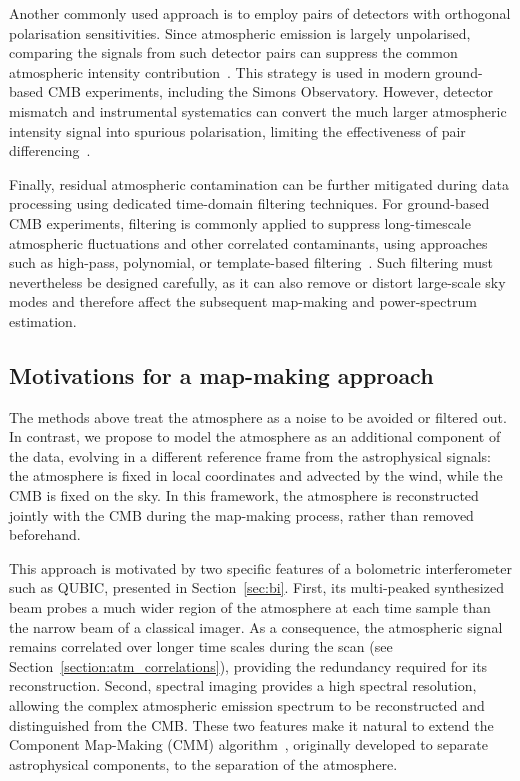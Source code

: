 \documentclass[a4paper,11pt]{article}
\begin{document}
Another commonly used approach is to employ pairs of detectors with orthogonal polarisation sensitivities. Since atmospheric emission is largely unpolarised, comparing the signals from such detector pairs can suppress the common atmospheric intensity contribution~\cite{errard2015,Biquard_2025}. This strategy is used in modern ground-based CMB experiments, including the Simons Observatory. However, detector mismatch and instrumental systematics can convert the much larger atmospheric intensity signal into spurious polarisation, limiting the effectiveness of pair differencing~\cite{Biquard_2025}.

Finally, residual atmospheric contamination can be further mitigated during data processing using dedicated time-domain filtering techniques. For ground-based CMB experiments, filtering is commonly applied to suppress long-timescale atmospheric fluctuations and other correlated contaminants, using approaches such as high-pass, polynomial, or template-based filtering~\cite{Poletti_2017,Wu_2023}. Such filtering must nevertheless be designed carefully, as it can also remove or distort large-scale sky modes and therefore affect the subsequent map-making and power-spectrum estimation.

\subsection{Motivations for a map-making approach}
\label{sec:motivations}

The methods above treat the atmosphere as a noise to be avoided or filtered out. In contrast, we propose to model the atmosphere as an additional component of the data, evolving in a different reference frame from the astrophysical signals: the atmosphere is fixed in local coordinates and advected by the wind, while the CMB is fixed on the sky. In this framework, the atmosphere is reconstructed jointly with the CMB during the map-making process, rather than removed beforehand.

This approach is motivated by two specific features of a bolometric interferometer such as QUBIC, presented in Section~\ref{sec:bi}. First, its multi-peaked synthesized beam probes a much wider region of the atmosphere at each time sample than the narrow beam of a classical imager. As a consequence, the atmospheric signal remains correlated over longer time scales during the scan (see Section~\ref{section:atm_correlations}), providing the redundancy required for its reconstruction. Second, spectral imaging provides a high spectral resolution, allowing the complex atmospheric emission spectrum to be reconstructed and distinguished from the CMB. These two features make it natural to extend the Component Map-Making (CMM) algorithm~\cite{cmm}, originally developed to separate astrophysical components, to the separation of the atmosphere.
\end{document}
